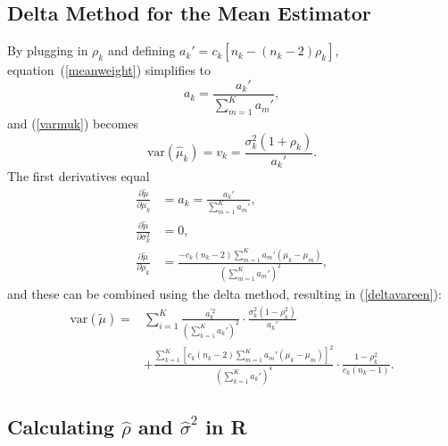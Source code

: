 \documentclass[11pt,a5paper,twoside]{book}
\begin{document}
{\subsection{Delta Method for the Mean Estimator}\label{suppdelta}

By plugging in $\rho_k$ and defining $a_k'=c_k[n_k-(n_k-2)\rho_k]$, equation~(\ref{meanweight}) simplifies to
\begin{equation}
\label{meanweight}
a_k=
\frac
{
a_k'
}
{
\sum_{m=1}^K a_m'
}
,
\end{equation}
and (\ref{varmuk})
becomes
\begin{equation}
\mbox{var}(\widehat{\mu}_k)=v_k=\frac{\sigma_k^2(1+\rho_k)}{a_k'}.
\end{equation}
The first derivatives equal
\begin{equation}
\begin{aligned}
\frac{\partial \tilde{\mu}}{\partial\mu_k} &= a_k = \frac{a_k'}{\sum_{m=1}^K a_m'},  \\
\frac{\partial\tilde{\mu}}{\partial\sigma_k^2}&=0,  \\
\frac{\partial\tilde{\mu}}{\partial\rho_k}&=\frac{-c_k(n_k-2)\sum_{m=1}^Ka_m'(\mu_k-\mu_m)}{\left( \sum_{m=1}^K a_m' \right)^2},
\end{aligned}
\end{equation}
and these can be combined using the delta method, resulting in (\ref{deltavareen}):
\[
\begin{aligned}
\mbox{var}(\tilde{\mu})=& \sum_{i=1}^K \frac{a_k^{'2}}{\left( \sum_{k=1}^K a_k' \right)^2} \cdot \frac{\sigma_k^2(1-\rho_k^2)}{a_k'}\\
& + \frac{\sum_{k=1}^K\left[ c_k(n_k-2)\sum_{m=1}^Ka_m'(\mu_k-\mu_m)\right]^2}{\left( \sum_{k=1}^K a_k' \right)^4}\cdot \frac{1-\rho_k^2}{c_k(n_k-1)}.
\end{aligned}
\]


\subsection{Calculating $\widehat{\rho}$ and $\widehat{\sigma}^2$ in R}

}
\end{document}
